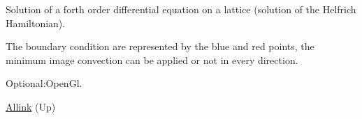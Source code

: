 \-Solution of a forth order differential equation on a lattice (solution of the \-Helfrich \-Hamiltonian). \par
 \-The boundary condition are represented by the blue and red points, the minimum image convection can be applied or not in every direction.\par
 \-Optional\-:\-Open\-Gl. 
\begin{DoxyItemize}
\item \hyperlink{index}{\-Allink} (\-Up)  
\end{DoxyItemize}
